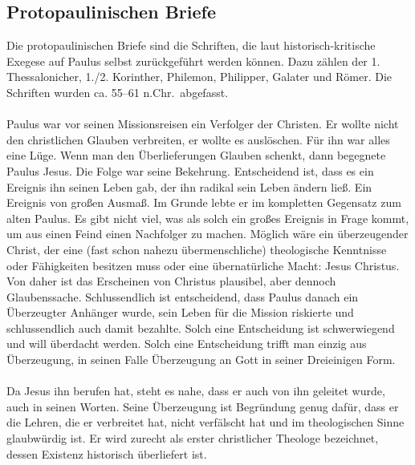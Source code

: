 \subsection*{Protopaulinischen Briefe}
Die protopaulinischen Briefe sind die Schriften, die laut historisch-kritische Exegese auf Paulus selbst zurückgeführt werden können. Dazu zählen der 1. Thessalonicher, 1./2. Korinther, Philemon, Philipper, Galater und Römer. Die Schriften wurden ca. 55--61 n.Chr.\ abgefasst.
\\~\\
Paulus war vor seinen Missionsreisen ein Verfolger der Christen. Er wollte nicht den christlichen Glauben verbreiten, er wollte es auslöschen. Für ihn war alles eine Lüge. Wenn man den Überlieferungen Glauben schenkt, dann begegnete Paulus Jesus. Die Folge war seine Bekehrung. Entscheidend ist, dass es ein Ereignis ihn seinen Leben gab, der ihn radikal sein Leben ändern ließ. Ein Ereignis von großen Ausmaß. Im Grunde lebte er im kompletten Gegensatz zum alten Paulus. Es gibt nicht viel, was als solch ein großes Ereignis in Frage kommt, um aus einen Feind einen Nachfolger zu machen. Möglich wäre ein überzeugender Christ, der eine (fast schon nahezu übermenschliche) theologische Kenntnisse oder Fähigkeiten besitzen muss oder eine übernatürliche Macht: Jesus Christus. Von daher ist das Erscheinen von Christus plausibel, aber dennoch Glaubenssache. Schlussendlich ist entscheidend, dass Paulus danach ein Überzeugter Anhänger wurde, sein Leben für die Mission riskierte und schlussendlich auch damit bezahlte. Solch eine Entscheidung ist schwerwiegend und will überdacht werden. Solch eine Entscheidung trifft man einzig aus Überzeugung, in seinen Falle Überzeugung an Gott in seiner Dreieinigen Form.
\\~\\
Da Jesus ihn berufen hat, steht es nahe, dass er auch von ihn geleitet wurde, auch in seinen Worten. Seine Überzeugung ist Begründung genug dafür, dass er die Lehren, die er verbreitet hat, nicht verfälscht hat und im theologischen Sinne glaubwürdig ist. Er wird zurecht als erster christlicher Theologe bezeichnet, dessen Existenz historisch überliefert ist.

